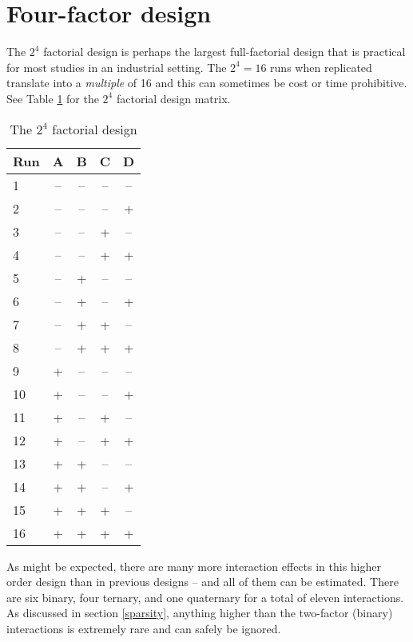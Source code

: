 \section{Four-factor design}\label{4fac}
The $2^{4}$ factorial design is perhaps the largest full-factorial design that is practical for most studies in an industrial setting.  The $ 2^{4} = 16 $ runs when replicated translate into a \textit{multiple} of 16 and this can sometimes be cost or time prohibitive.  See Table \ref{tab7} for the $2^{4}$ factorial design matrix.

\begin{table}[h]\caption{The $2^{4}$ factorial design}\label{tab7}
\begin{center}
\begin{tabular}{|l|c|c|c|c|}
\hline Run & A & B  & C  & D \\ 
\hline 1  & -- & -- & -- & --\\ 
\hline 2  & -- & -- & -- & + \\ 
\hline 3  & -- & -- & +  & --\\ 
\hline 4  & -- & -- & +  & + \\
\hline 5  & -- & +  & -- & --\\
\hline 6  & -- & +  & -- & + \\
\hline 7  & -- & +  & +  & --\\
\hline 8  & -- & +  & +  & + \\
\hline 9  & +  & -- & -- & --\\
\hline 10 & +  & -- & -- & + \\
\hline 11 & +  & -- & +  & --\\
\hline 12 & +  & -- & +  & + \\
\hline 13 & +  & +  & -- & --\\
\hline 14 & +  & +  & -- & + \\
\hline 15 & +  & +  & +  & --\\
\hline 16 & +  & +  & +  & + \\ 
\hline 
\end{tabular} 
\end{center}
\end{table}

As might be expected, there are many more interaction effects in this higher order design than in previous designs -- and all of them can be estimated. There are six binary, four ternary, and one quaternary for a total of eleven interactions.  As discussed in section \ref{sparsity}, anything higher than the two-factor (binary) interactions is extremely rare and can safely be ignored.

